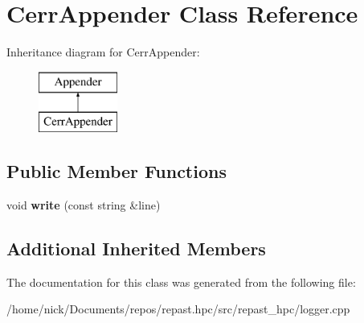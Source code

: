 \hypertarget{class_cerr_appender}{\section{Cerr\-Appender Class Reference}
\label{class_cerr_appender}
}
Inheritance diagram for Cerr\-Appender\-:\begin{figure}[H]
\begin{center}
\leavevmode
\includegraphics[height=2.000000cm]{class_cerr_appender}
\end{center}
\end{figure}
\subsection*{Public Member Functions}
\begin{DoxyCompactItemize}
\item 
\hypertarget{class_cerr_appender_a190f6e2f820f26bf51aa142eb746f041}{void {\bfseries write} (const string \&line)}\label{class_cerr_appender_a190f6e2f820f26bf51aa142eb746f041}

\end{DoxyCompactItemize}
\subsection*{Additional Inherited Members}


The documentation for this class was generated from the following file\-:\begin{DoxyCompactItemize}
\item 
/home/nick/\-Documents/repos/repast.\-hpc/src/repast\-\_\-hpc/logger.\-cpp\end{DoxyCompactItemize}
